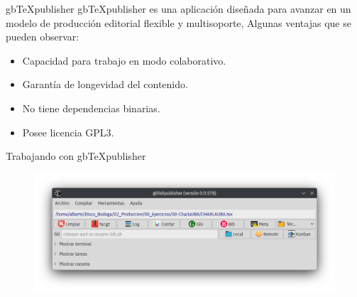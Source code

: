 \documentclass[14pt,aspectratio=169]{beamer}
\begin{document}

\begin{frame}{gbTeXpublisher}
gbTeXpublisher es una aplicación diseñada para avanzar en un modelo de producción editorial flexible y multisoporte, Algunas ventajas que se pueden observar:

\begin{itemize}
	\item<2-> Capacidad para trabajo en modo colaborativo.
	\item<3-> Garantía de longevidad del contenido.
	\item<4-> No tiene dependencias binarias.
	\item<5-> Posee licencia GPL3.
\end{itemize}
\end{frame}

\begin{frame}{Trabajando con gbTeXpublisher}
	\begin{figure}
		\centering
		\includegraphics[width=.8\textwidth]{captura.png}
	\end{figure}
\end{frame}

\end{document}
